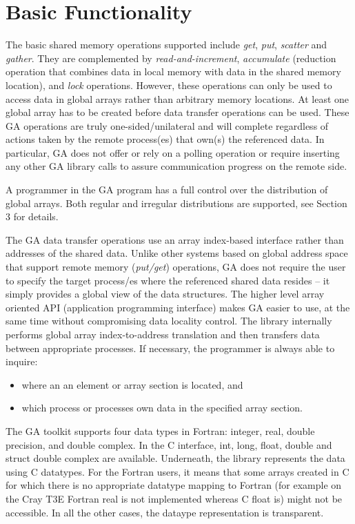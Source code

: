 \section{Basic Functionality}

The basic shared memory operations supported include \emph{get}, \emph{put},
\emph{scatter} and \emph{gather}. They are complemented by 
\emph{read-and-increment}, \emph{accumulate} (reduction operation
that combines data in local memory with data in the shared memory
location), and \emph{lock} operations. However, these operations can
only be used to access data in global arrays rather than arbitrary
memory locations. At least one global array has to be created before
data transfer operations can be used. These GA operations are truly
one-sided/unilateral and will complete regardless of actions taken
by the remote process(es) that own(s) the referenced data. In particular,
GA does not offer or rely on a polling operation or require inserting
any other GA library calls to assure communication progress on the
remote side. 

A programmer in the GA program has a full control over the distribution
of global arrays. Both regular and irregular distributions are supported,
see Section 3 for details. 

The GA data transfer operations use an array index-based interface
rather than addresses of the shared data. Unlike other systems based
on global address space that support remote memory (\emph{put/get})
operations, GA does not require the user to specify the target process/es
where the referenced shared data resides -- it simply provides a global
view of the data structures. The higher level array oriented API (application
programming interface) makes GA easier to use, at the same time without
compromising data locality control. The library internally performs
global array index-to-address translation and then transfers data
between appropriate processes. If necessary, the programmer is always
able to inquire: 
\begin{itemize}
\item where an an element or array section is located, and 
\item which process or processes own data in the specified array section. 
\end{itemize}
The GA toolkit supports four data types in Fortran: integer, real,
double precision, and double complex. In the C interface, int, long,
float, double and struct double complex are available. Underneath,
the library represents the data using C datatypes. For the Fortran
users, it means that some arrays created in C for which there is no
appropriate datatype mapping to Fortran (for example on the Cray T3E
Fortran real is not implemented whereas C float is) might not be accessible.
In all the other cases, the dataype representation is transparent. 


